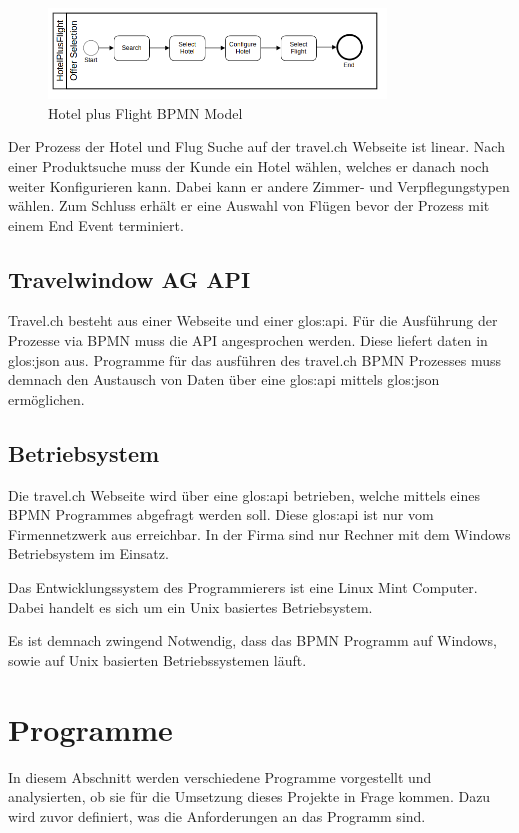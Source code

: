 \begin{figure}[H]
	\centering
	\includegraphics[width=0.8\textwidth]{images/hotelplusflight.png}
	\caption{Hotel plus Flight BPMN Model}
	\label{fig:recherche:rahmenbedingungen:hotelplusflight}
\end{figure}
Der Prozess der Hotel und Flug Suche auf der travel.ch Webseite ist linear. Nach einer Produktsuche muss der Kunde ein Hotel wählen, welches er danach noch weiter Konfigurieren kann. Dabei kann er andere Zimmer- und Verpflegungstypen wählen. Zum Schluss erhält er eine Auswahl von Flügen bevor der Prozess mit einem End Event terminiert.

\subsection{Travelwindow AG API}
\label{sec:Recherche:rahmenbedingungen:api}
Travel.ch besteht aus einer Webseite und einer \Gls{glos:api}. Für die Ausführung der Prozesse via BPMN muss die API angesprochen werden. Diese liefert daten in \Gls{glos:json} aus. Programme für das ausführen des travel.ch BPMN Prozesses muss demnach den Austausch von Daten über eine \Gls{glos:api} mittels \Gls{glos:json} ermöglichen.

\subsection{Betriebsystem}
Die travel.ch Webseite wird über eine \Gls{glos:api} betrieben, welche mittels eines BPMN Programmes abgefragt werden soll. Diese \Gls{glos:api} ist nur vom Firmennetzwerk aus erreichbar. In der Firma sind nur Rechner mit dem Windows Betriebsystem im Einsatz.

Das Entwicklungssystem des Programmierers ist eine Linux Mint Computer. Dabei handelt es sich um ein Unix basiertes Betriebsystem.

Es ist demnach zwingend Notwendig, dass das BPMN Programm auf Windows, sowie auf Unix basierten Betriebssystemen läuft.

\section{Programme}
In diesem Abschnitt werden verschiedene Programme vorgestellt und analysierten, ob sie für die Umsetzung dieses Projekte in Frage kommen. Dazu wird zuvor definiert, was die Anforderungen an das Programm sind.

